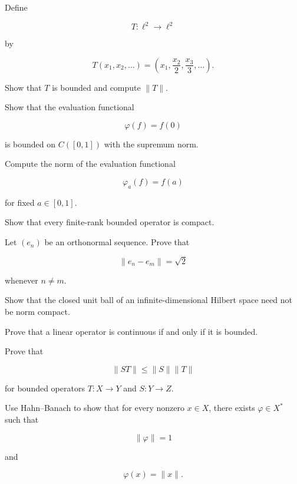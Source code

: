 \begin{exercise}[2]
Define

\[
T:\ell^2\to\ell^2
\]

by

\[
T(x_1,x_2,\ldots)
=
\left(
x_1,\frac{x_2}{2},\frac{x_3}{3},\ldots
\right).
\]

Show that \(T\) is bounded and compute \(\|T\|\).
\end{exercise}

\begin{exercise}[2]
Show that the evaluation functional

\[
\varphi(f)=f(0)
\]

is bounded on \(C([0,1])\) with the supremum norm.
\end{exercise}

\begin{exercise}[2]
Compute the norm of the evaluation functional

\[
\varphi_a(f)=f(a)
\]

for fixed \(a\in[0,1]\).
\end{exercise}

\begin{exercise}[2]
Show that every finite-rank bounded operator is compact.
\end{exercise}

\begin{exercise}[2]
Let \((e_n)\) be an orthonormal sequence. Prove that

\[
\|e_n-e_m\|
=
\sqrt{2}
\]

whenever \(n\neq m\).
\end{exercise}

\begin{exercise}[2]
Show that the closed unit ball of an infinite-dimensional Hilbert space
need not be norm compact.
\end{exercise}

\begin{exercise}[3]
Prove that a linear operator is continuous if and only if it is bounded.
\end{exercise}

\begin{exercise}[3]
Prove that

\[
\|ST\|
\leq
\|S\|\|T\|
\]

for bounded operators \(T:X\to Y\) and \(S:Y\to Z\).
\end{exercise}

\begin{exercise}[3]
Use Hahn--Banach to show that for every nonzero \(x\in X\), there exists
\(\varphi\in X^*\) such that

\[
\|\varphi\|=1
\]

and

\[
\varphi(x)=\|x\|.
\]
\end{exercise}

